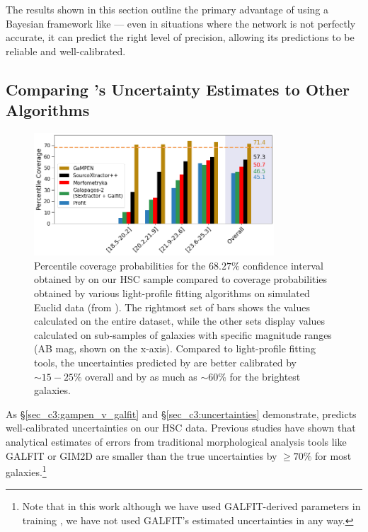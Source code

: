 The results shown in this section outline the primary advantage of using a Bayesian framework like \gampen{}--- even in situations where the network is not perfectly accurate, it can predict the right level of precision, allowing its predictions to be reliable and well-calibrated.

\subsection{Comparing \gampen{}'s Uncertainty Estimates to Other Algorithms}
\label{sec_c3:uncer_comp}

\begin{figure}[htb]
    \centering
    \includegraphics[width = 0.8\textwidth]{cov_prob_euclud_comp.png}
    \caption{Percentile coverage probabilities for the $68.27\%$ confidence interval obtained by \gampen{} on our HSC sample compared to coverage probabilities obtained by various light-profile fitting algorithms on simulated Euclid data %
    (from \citealp{euclid_morph}). The rightmost set of bars shows the values calculated on the entire dataset, while the other sets display values calculated on sub-samples of galaxies with specific magnitude ranges (AB mag, shown on the x-axis). %
    Compared to light-profile fitting tools, the uncertainties predicted by \gampen{} are better calibrated by $\sim15-25\%$ overall and by as much as $\sim60\%$ for the brightest galaxies.}
    \label{fig_c3:cov_prob_comp_euclud}
\end{figure}

As \S \ref{sec_c3:gampen_v_galfit} and \S\ref{sec_c3:uncertainties} demonstrate, \gampen{} predicts well-calibrated uncertainties on our HSC data. Previous studies \citep[e.g.,][]{haussler_07} have shown that analytical estimates of errors from traditional morphological analysis tools like GALFIT or GIM2D \citep{gim2d} are smaller than the true uncertainties by $\geq70\%$ for most galaxies.\footnote{Note that in this work although we have used GALFIT-derived parameters in training \gampen{}, we have not used GALFIT's estimated uncertainties in any way.}

